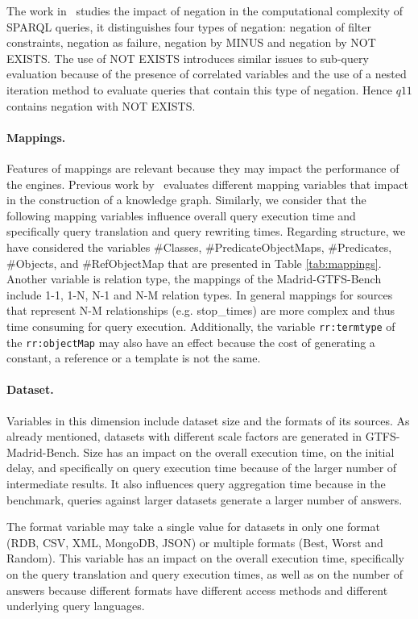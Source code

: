 The work in~\citep{angles2016negation} studies the impact of negation in the computational complexity of SPARQL queries, it distinguishes four types of negation: negation of filter constraints, negation as failure, negation by MINUS and negation by NOT EXISTS.  The use of NOT EXISTS introduces similar issues to sub-query evaluation because of the  presence of correlated variables and the use of a nested iteration method to evaluate queries that contain this type of negation. Hence $q11$ contains negation with NOT EXISTS.


\noindent\paragraph{\textbf{Mappings.}}
Features of mappings are relevant because they may impact  the performance of the engines. Previous work by~\citep{chaves2019what} evaluates different mapping variables that impact in the construction of a knowledge graph. Similarly, we consider that the following mapping variables influence overall query execution time and specifically query translation and query rewriting times. Regarding structure, we have considered the variables \#Classes, \#PredicateObjectMaps, \#Predicates, \#Objects, and \#RefObjectMap that are presented in Table \ref{tab:mappings}. Another variable is relation type, the mappings of the Madrid-GTFS-Bench include 1-1, 1-N, N-1 and N-M relation types. In general mappings for sources that represent N-M relationships (e.g. stop\_times) are more complex and thus time consuming for query execution. Additionally, the variable \texttt{rr:termtype} of the \texttt{rr:objectMap} may also have an effect because the cost of generating a constant, a reference or a template is not the same.

\noindent\paragraph{\textbf{Dataset.}}
Variables in this dimension include dataset size and the formats of its sources. As already mentioned, datasets with different scale factors are generated in GTFS-Madrid-Bench. Size has an impact on the overall execution time, on the initial delay, and specifically on query execution time because of the larger number of intermediate results. It also influences query aggregation time because in the benchmark, queries against larger datasets generate a larger number of answers.

The format variable may take a single value for datasets in only one format (RDB, CSV, XML, MongoDB, JSON) or multiple formats (Best, Worst and Random). This variable has an impact on the overall execution time, specifically on the query translation and query execution times, as well as on the number of answers because  different formats have different access methods and different underlying query languages.

